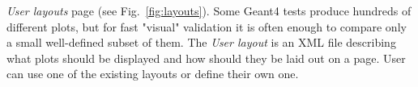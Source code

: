 \textit{User layouts} page (see Fig.~\ref{fig:layouts}). Some Geant4 tests produce hundreds of different plots, but for fast "visual" validation it is often enough to compare only a small well-defined subset of them. The \textit{User layout} is an XML file describing what plots should be displayed and how should they be laid out on a page. User can use one of the existing layouts or define their own one.
